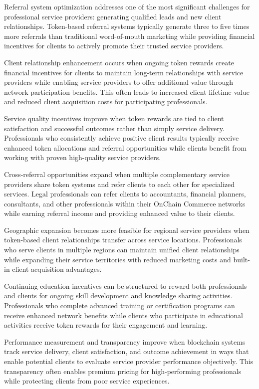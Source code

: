 \documentclass[
  Letterpaper,
]{scrbook}
\begin{document}
Referral system optimization addresses one of the most significant
challenges for professional service providers: generating qualified
leads and new client relationships. Token-based referral systems
typically generate three to five times more referrals than traditional
word-of-mouth marketing while providing financial incentives for clients
to actively promote their trusted service providers.

Client relationship enhancement occurs when ongoing token rewards create
financial incentives for clients to maintain long-term relationships
with service providers while enabling service providers to offer
additional value through network participation benefits. This often
leads to increased client lifetime value and reduced client acquisition
costs for participating professionals.

Service quality incentives improve when token rewards are tied to client
satisfaction and successful outcomes rather than simply service
delivery. Professionals who consistently achieve positive client results
typically receive enhanced token allocations and referral opportunities
while clients benefit from working with proven high-quality service
providers.

Cross-referral opportunities expand when multiple complementary service
providers share token systems and refer clients to each other for
specialized services. Legal professionals can refer clients to
accountants, financial planners, consultants, and other professionals
within their OnChain Commerce networks while earning referral income and
providing enhanced value to their clients.

Geographic expansion becomes more feasible for regional service
providers when token-based client relationships transfer across service
locations. Professionals who serve clients in multiple regions can
maintain unified client relationships while expanding their service
territories with reduced marketing costs and built-in client acquisition
advantages.

Continuing education incentives can be structured to reward both
professionals and clients for ongoing skill development and knowledge
sharing activities. Professionals who complete advanced training or
certification programs can receive enhanced network benefits while
clients who participate in educational activities receive token rewards
for their engagement and learning.

Performance measurement and transparency improve when blockchain systems
track service delivery, client satisfaction, and outcome achievement in
ways that enable potential clients to evaluate service provider
performance objectively. This transparency often enables premium pricing
for high-performing professionals while protecting clients from poor
service experiences.
\end{document}
